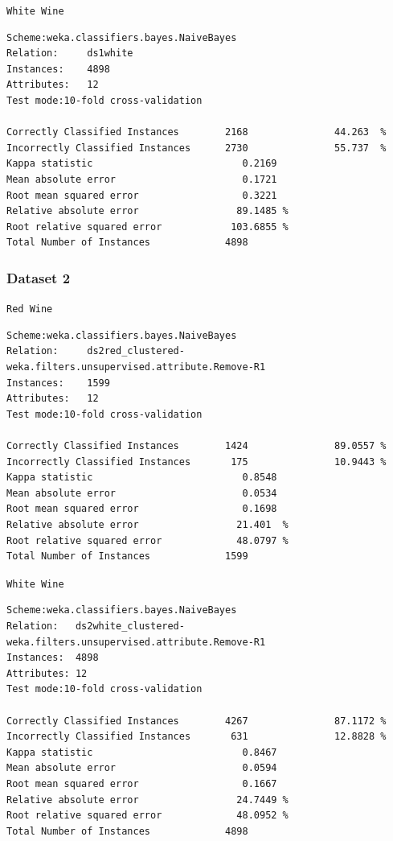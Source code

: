\documentclass[a4paper,12pt,openany]{report}
\newenvironment{wekaconsole}[1][]{

	\par \noindent
	\begin{samepage}
	\texttt{#1}
	\begin{mdframed}
	\small
	\ttfamily
}{
	\end{mdframed}
	\end{samepage}
}
\begin{document}
\begin{wekaconsole}[White Wine]
\begin{verbatim}
Scheme:weka.classifiers.bayes.NaiveBayes 
Relation:     ds1white
Instances:    4898
Attributes:   12
Test mode:10-fold cross-validation

Correctly Classified Instances        2168               44.263  %
Incorrectly Classified Instances      2730               55.737  %
Kappa statistic                          0.2169
Mean absolute error                      0.1721
Root mean squared error                  0.3221
Relative absolute error                 89.1485 %
Root relative squared error            103.6855 %
Total Number of Instances             4898
\end{verbatim}
\end{wekaconsole}

\subsubsection*{Dataset 2}
\begin{wekaconsole}[Red Wine]
\begin{verbatim}
Scheme:weka.classifiers.bayes.NaiveBayes 
Relation:     ds2red_clustered-weka.filters.unsupervised.attribute.Remove-R1
Instances:    1599
Attributes:   12
Test mode:10-fold cross-validation

Correctly Classified Instances        1424               89.0557 %
Incorrectly Classified Instances       175               10.9443 %
Kappa statistic                          0.8548
Mean absolute error                      0.0534
Root mean squared error                  0.1698
Relative absolute error                 21.401  %
Root relative squared error             48.0797 %
Total Number of Instances             1599     
\end{verbatim}
\end{wekaconsole}

\begin{wekaconsole}[White Wine]
\begin{verbatim}
Scheme:weka.classifiers.bayes.NaiveBayes 
Relation:   ds2white_clustered-weka.filters.unsupervised.attribute.Remove-R1
Instances:  4898
Attributes: 12
Test mode:10-fold cross-validation

Correctly Classified Instances        4267               87.1172 %
Incorrectly Classified Instances       631               12.8828 %
Kappa statistic                          0.8467
Mean absolute error                      0.0594
Root mean squared error                  0.1667
Relative absolute error                 24.7449 %
Root relative squared error             48.0952 %
Total Number of Instances             4898
\end{verbatim}
\end{wekaconsole}
\end{document}
